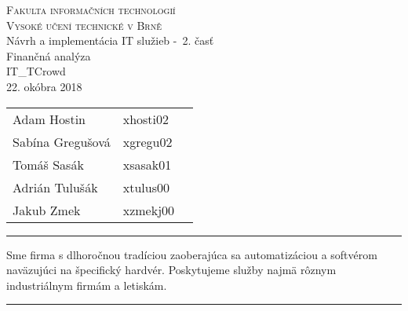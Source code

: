 \documentclass[a4paper, 11pt]{article}
\begin{document}
\begin{center}
\Huge
\textsc{Fakulta informačních technologií\\
Vysoké učení technické v Brně}
\\[84mm]
\LARGE Návrh a implementácia IT služieb \--\ 2. časť\\
\Huge Finančná analýza\\
\vspace{3.5cm}
\LARGE IT\_TCrowd\\
\Large 22. okóbra 2018
\end{center}

\hfill

\begin{minipage}[l]{0.6 \textwidth}
\Large
\begin{tabular}{l l l}
Adam Hostin  & xhosti02\\
Sabína Gregušová & xgregu02\\
Tomáš Sasák & xsasak01 \\
Adrián Tulušák  & xtulus00 \\
Jakub Zmek & xzmekj00 \\
\end{tabular}
\end{minipage}
\thispagestyle{empty}
\clearpage

\setcounter{page}{1}
\noindent\rule{\textwidth}{1pt}
\begin{center}
Sme firma s dlhoročnou tradíciou zaoberajúca sa automatizáciou a softvérom naväzujúci na špecifický hardvér. Poskytujeme služby najmä rôznym industriálnym firmám a letiskám.  \\
\end{center}
\noindent\rule{\textwidth}{1pt}

\end{document}

